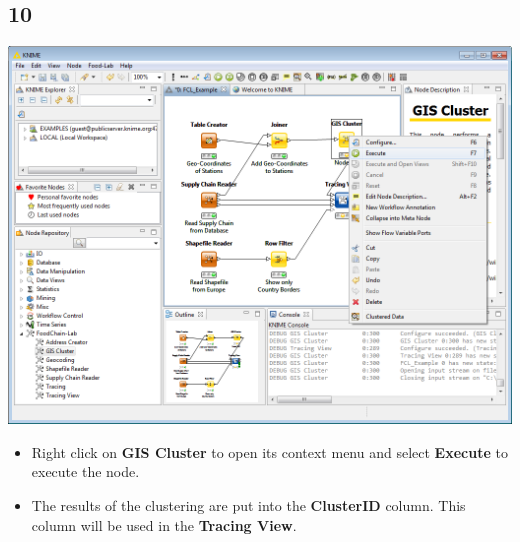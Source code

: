 \documentclass{beamer}
\begin{document}
\subsection{10}
\begin{frame}
	\begin{center}
  		\includegraphics[height=0.6\textheight]{10.png}
	\end{center}
	\begin{itemize}
		\item Right click on \textbf{GIS Cluster} to open its context menu and select \textbf{Execute} to execute the node.
		\item The results of the clustering are put into the \textbf{ClusterID} column. This column will be used in the \textbf{Tracing View}.
	\end{itemize}
\end{frame}
\end{document}
